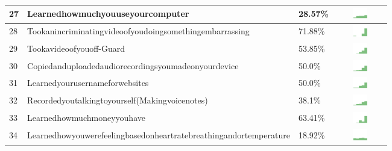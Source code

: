 \begin{table}[t]
\begin{center}
\begin{tabular}{| p{0.5cm} | p{7cm} | p{1cm} | c |}
27 & Learnedhowmuchyouuseyourcomputer & 28.57\% & \includegraphics[width = 2cm, height = 0.5cm]{../learnedhowmuchyouuseyourcomputerAPPSERVER} \\ \hline 
28 & Tookanincriminatingvideoofyoudoingsomethingembarrassing & 71.88\% & \includegraphics[width = 2cm, height = 0.5cm]{../tookanincriminatingvideoofyoudoingsomethingembarrassingAPPSERVER} \\ \hline 
29 & Tookavideoofyouoff-Guard & 53.85\% & \includegraphics[width = 2cm, height = 0.5cm]{../tookavideoofyouoff-guardAPPSERVER} \\ \hline 
30 & Copiedanduploadedaudiorecordingsyoumadeonyourdevice & 50.0\% & \includegraphics[width = 2cm, height = 0.5cm]{../copiedanduploadedaudiorecordingsyoumadeonyourdeviceAPPSERVER} \\ \hline 
31 & Learnedyourusernameforwebsites & 50.0\% & \includegraphics[width = 2cm, height = 0.5cm]{../learnedyourusernameforwebsitesAPPSERVER} \\ \hline 
32 & Recordedyoutalkingtoyourself(Makingvoicenotes) & 38.1\% & \includegraphics[width = 2cm, height = 0.5cm]{../recordedyoutalkingtoyourself(makingvoicenotes)APPSERVER} \\ \hline 
33 & Learnedhowmuchmoneyyouhave & 63.41\% & \includegraphics[width = 2cm, height = 0.5cm]{../learnedhowmuchmoneyyouhaveAPPSERVER} \\ \hline 
34 & Learnedhowyouwerefeelingbasedonheartratebreathingandortemperature & 18.92\% & \includegraphics[width = 2cm, height = 0.5cm]{../learnedhowyouwerefeelingbasedonheartratebreathingandortemperatureAPPSERVER} \\ \hline 

\end{tabular}
\end{center}
\end{table}
